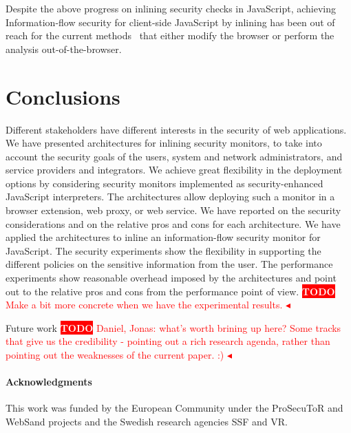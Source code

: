 \documentclass{llncs}
\newcommand{\todo}[1]{\colorbox{red}{\textcolor{white}{\sffamily\bfseries\scriptsize TODO}} \textcolor{red}{#1} \textcolor{red}{$\blacktriangleleft$}}
\begin{document}
Despite the above progress on inlining security checks in JavaScript, achieving
Information-flow security for client-side JavaScript by inlining has been out of
reach for the current methods~\cite{Vogt+:NDSS07,DBLP:conf/pldi/ChughMJL09,Yip:Narula:Krohn:Morris:EUROSYS09,Jang+:CCS10,DeGroef+:CCS12}  that either
modify the browser or perform the analysis out-of-the-browser.

\section{Conclusions}
\label{sec:conc}
Different stakeholders have different interests in the security of web
applications. We have presented architectures for inlining security
monitors, to take into account the security goals of the users, system and
network administrators, and service providers and integrators.
%
We achieve great flexibility in the deployment options by considering
security monitors implemented as security-enhanced JavaScript interpreters.
%
The architectures allow deploying such a monitor in a browser
extension, web proxy, or web service.
%
We have reported on the security considerations and on the relative pros and
cons for each architecture.
%
We have applied the architectures to inline an information-flow
security monitor for JavaScript.
%
The security experiments show the
flexibility in supporting the different policies on the sensitive
information from the user. 
%
The performance experiments show reasonable overhead imposed by the
architectures and point out to the relative pros and cons from the
performance point of view. \todo{Make a bit more concrete when we have
the experimental results.}

Future work \todo{Daniel, Jonas: what's worth brining up here? Some
tracks that give us the credibility - pointing out a rich research agenda, rather
than pointing out the weaknesses of the current paper. :) }

\paragraph{Acknowledgments}
This work was funded by 
the European Community under the ProSecuToR and WebSand projects
and
the Swedish research agencies SSF and VR.




\end{document}
